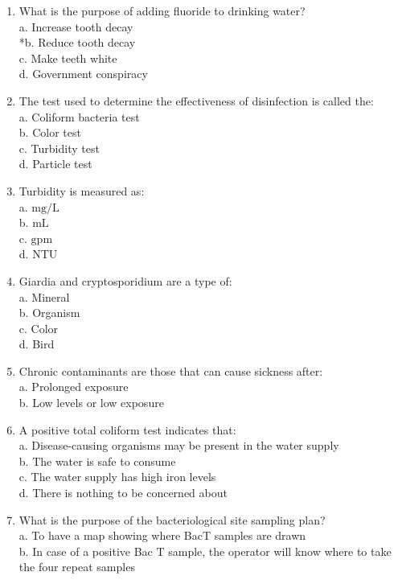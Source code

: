 \begin{enumerate}[1.]
\item What is the purpose of adding fluoride to drinking water?\\
a. Increase tooth decay\\
*b. Reduce tooth decay\\
c. Make teeth white\\
d. Government conspiracy\\
\item The test used to determine the effectiveness of disinfection is called the:\\
a. Coliform bacteria test\\
b. Color test\\
c. Turbidity test\\
d. Particle test\\
\item Turbidity is measured as:\\
a. $\mathrm{mg} / \mathrm{L}$\\
b. $\mathrm{mL}$\\
c. $\mathrm{gpm}$\\
d. NTU\\
\item Giardia and cryptosporidium are a type of:\\
a. Mineral\\
b. Organism\\
c. Color\\
d. Bird\\
\item Chronic contaminants are those that can cause sickness after:\\
a. Prolonged exposure\\
b. Low levels or low exposure\\
\item A positive total coliform test indicates that:\\
a. Disease-causing organisms may be present in the water supply\\
b. The water is safe to consume\\
c. The water supply has high iron levels\\
d. There is nothing to be concerned about\\
\item What is the purpose of the bacteriological site sampling plan?\\
a. To have a map showing where BacT samples are drawn\\
b. In case of a positive Bac $\mathrm{T}$ sample, the operator will know where to take the four repeat samples\\

\end{enumerate}
